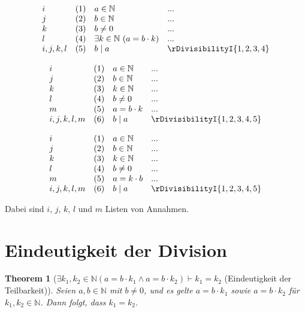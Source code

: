 \documentclass{book}
\theoremstyle{plain}
\newtheorem{theorem}{Theorem}
\theoremstyle{remark}
\theoremstyle{definition}
\begin{document}
\[
\begin{array}{llll}
    i & (1) & a \in \mathbb{N} & ... \\
    j & (2) & b \in \mathbb{N} & ... \\
    k & (3) & b \neq 0 & ... \\
    l & (4) & \exists k \in \mathbb{N} \ (a = b \cdot k) & ... \\
    i,j,k,l & (5) & b \mid a & \rDivisibilityI{1,2,3,4} \\
\end{array}
\]

\[
\begin{array}{llll}
    i & (1) & a \in \mathbb{N} & ... \\
    j & (2) & b \in \mathbb{N} & ... \\
    k & (3) & k \in \mathbb{N} & ... \\
    l & (4) & b \neq 0 & ... \\
    m & (5) & a = b \cdot k & ... \\
    i,j,k,l,m & (6) & b \mid a & \rDivisibilityI{1,2,3,4,5} \\
\end{array}
\]

\[
\begin{array}{llll}
    i & (1) & a \in \mathbb{N} & ... \\
    j & (2) & b \in \mathbb{N} & ... \\
    k & (3) & k \in \mathbb{N} & ... \\
    l & (4) & b \neq 0 & ... \\
    m & (5) & a = k\cdot b  & ... \\
    i,j,k,l,m & (6) & b \mid a & \rDivisibilityI{1,2,3,4,5} \\
\end{array}
\]

Dabei sind \( i \), \( j \), \(k\), \(l\) und \(m\) Listen von Annahmen.

\section{Eindeutigkeit der Division}

\label{ExkSubOnewkSubTwoInNaturalLpaEqualsbMultkSubOneAndaEqualsbMultkSubTwoRpImpkSubOneEqualskSubTwo}
\begin{theorem}[\(\exists k_1, k_2 \in \mathbb{N} (a = b \cdot k_1 \land a = b \cdot k_2) \vdash k_1 = k_2\) (Eindeutigkeit der Teilbarkeit)]
Seien \( a, b \in \mathbb{N} \) mit \( b \neq 0 \), und es gelte \( a = b \cdot k_1 \) sowie \( a = b \cdot k_2 \) für \( k_1, k_2 \in \mathbb{N} \). Dann folgt, dass \( k_1 = k_2 \).
\end{theorem}
\end{document}

